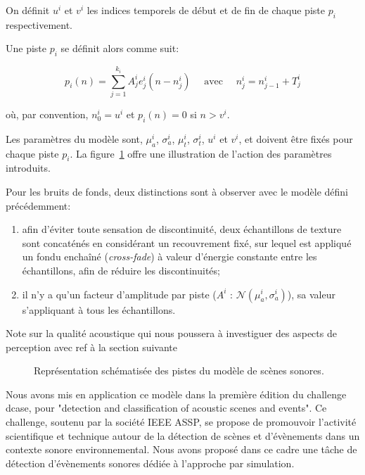 On définit $u^i$ et $v^i$ les indices temporels de début et de fin de chaque piste $p_i$ respectivement.

Une piste $p_i$ se définit alors comme suit:

\begin{equation}
\label{eq:ch4_eq2}
p_{i}(n)= \sum_{j=1}^{k_i} A_j^i e_j^i(n-n_j^i) \quad \textrm{ avec } \quad n_j^i=n_{j-1}^i + T_j^i
\end{equation}

où, par convention, $n^i_0=u^i$ et $p_i(n)=0$ si $n>v^i$.

Les paramètres du modèle sont, $\mu_a^i$, $\sigma_a^i$, $\mu_t^i$, $\sigma_t^i$, $u^i$ et $v^i$, et doivent être fixés pour chaque piste $p_i$. La figure~\ref{fig:modelSequence} offre une illustration de l'action des paramètres introduits.

Pour les bruits de fonds, deux distinctions sont à observer avec le modèle défini précédemment:

\begin{enumerate}
\item afin d'éviter toute sensation de discontinuité, deux échantillons de texture sont concaténés en considérant un recouvrement fixé, sur lequel est appliqué un fondu enchaîné (\emph{cross-fade}) à valeur d'énergie constante entre les échantillons, afin de réduire les discontinuités;
\item il n'y a qu'un facteur d'amplitude par piste ($A^i \textrm{ : } \mathcal{N}(\mu_a^{i},\sigma_a^{i})$), sa valeur s'appliquant à tous les échantillons.
\end{enumerate}

Note sur la qualité acoustique qui nous poussera à investiguer des aspects de perception avec ref à la section suivante

\begin{figure}[t]
        \def\svgwidth{\linewidth}
        
       \caption{Représentation schématisée des pistes du modèle de scènes sonores.}\label{fig:modelSequence}
\end{figure}

Nous avons mis en application ce modèle dans la première édition du challenge dcase, pour "detection and classification of acoustic scenes and events". Ce challenge, soutenu par la société IEEE ASSP, se propose de promouvoir l'activité scientifique et technique autour de la détection de scènes et d'évènements dans un contexte sonore environnemental\cite{stowellhal-01253912}. Nous avons proposé dans ce cadre une tâche de détection d'évènements sonores dédiée à l'approche par simulation.

